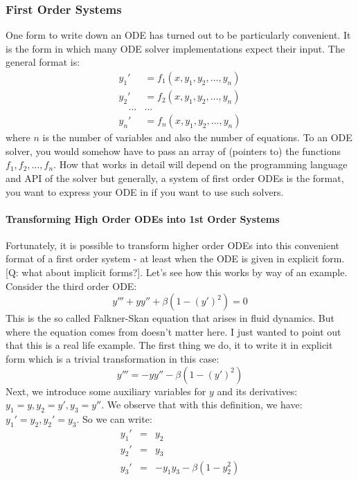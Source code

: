 \subsubsection{First Order Systems}
One form to write down an ODE has turned out to be particularly convenient. It is the form in which many ODE solver implementations expect their input. The general format is:
\begin{eqnarray}
 y_1' &= f_1(x, y_1, y_2, \ldots, y_n) \\
 y_2' &= f_2(x, y_1, y_2, \ldots, y_n) \\
 \quad \ldots & \ldots \\
 y_n' &= f_n(x, y_1, y_2, \ldots, y_n)
\end{eqnarray}
where $n$ is the number of variables and also the number of equations. To an ODE solver, you would somehow have to pass an array of (pointers to) the functions $f_1, f_2, \ldots, f_n$. How that works in detail will depend on the programming language and API of the solver but generally, a system of first order ODEs is the format, you want to express your ODE in if you want to use such solvers.


\paragraph{Transforming High Order ODEs into 1st Order Systems}
Fortunately, it is possible to transform higher order ODEs into this convenient format of a first order system - at least when the ODE is given in explicit form. [Q: what about implicit forms?]. Let's see how this works by way of an example. Consider the third order ODE:
\begin{equation}
 y''' + y y'' + \beta (1 - (y')^2 ) = 0
\end{equation}
This is the so called Falkner-Skan equation that arises in fluid dynamics. But where the equation comes from doesn't matter here. I just wanted to point out that this is a real life example. The first thing we do, it to write it in explicit form which is a trivial transformation in this case:
\begin{equation}
 y''' =  - y y'' - \beta (1 - (y')^2 ) 
\end{equation}
Next, we introduce some auxiliary variables for $y$ and its derivatives: $y_1 = y, y_2 = y', y_3 = y''$. We observe that with this definition, we have: $y_1' = y_2, y_2' = y_3$. So we can write:
\begin{eqnarray}
 y_1' &=& y_2 \\
 y_2' &=& y_3 \\
 y_3' &=& -y_1 y_3 - \beta (1 - y_2^2)
\end{eqnarray}


